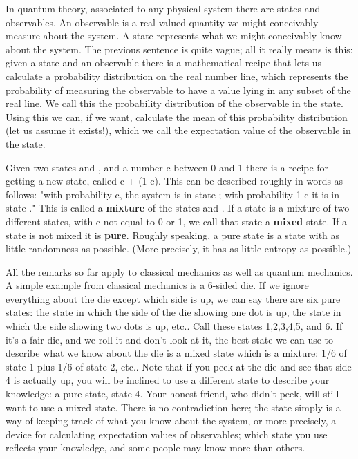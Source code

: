 In quantum theory, associated to any physical system there are
states and observables.  An observable is a real-valued quantity
we might conceivably measure about the system.  A state
represents what we might conceivably  know about the system.  The
previous sentence is quite vague; all it really means is this:
given a state and an observable there is a mathematical recipe
that lets us calculate a probability distribution on the real
number line, which represents the probability of measuring the
observable to have a value lying in any subset of the real line. 
We call this the probability distribution of the observable in
the state.  Using this we can, if we want, calculate the mean of this
probability distribution (let us assume it exists!), which we
call the expectation value of the observable in the state.  

Given two states \Psi  and \Phi , and a number c between 0 and 1
there is a recipe for getting a new state, called c \Psi  +
(1-c)\Phi .  This can be described roughly in words as follows:
"with probability c, the system is in state \Psi ; with probability
1-c it is in state \Phi ."   This is called a \textbf{mixture} of the
states \Psi  and \Phi .  If a state is a mixture of two different
states, with c not equal to 0 or 1, we call that state a \textbf{mixed}
state.  If a state is not mixed it is \textbf{pure}.  Roughly speaking,
a pure state is a state with as little randomness as possible. 
(More precisely, it has as little entropy as possible.)  

All the remarks so far apply to classical mechanics as well as
quantum mechanics.  A simple example from classical mechanics is
a 6-sided die.  If we ignore everything about the die except
which side is up, we can say there are six pure states: the state
in which the side of the die showing one dot is up, the state in
which the side showing two dots is up, etc..  Call these states
1,2,3,4,5, and 6. If it's a fair die, and we roll it and don't
look at it, the best state we can use to describe what we know
about the die is a mixed state which is a mixture: 1/6 of state 1
plus 1/6 of state 2, etc..  Note that if you peek at the die and
see that side 4 is actually up, you will be inclined to use a
different state to describe your knowledge: a pure state, state
4.   Your honest friend, who didn't peek, will still want to use
a mixed state.  There is no contradiction here; the state simply
is a way of keeping track of what you know about the system, or
more precisely, a device for calculating expectation values of
observables; which state you use reflects your knowledge, and
some people may know more than others.

